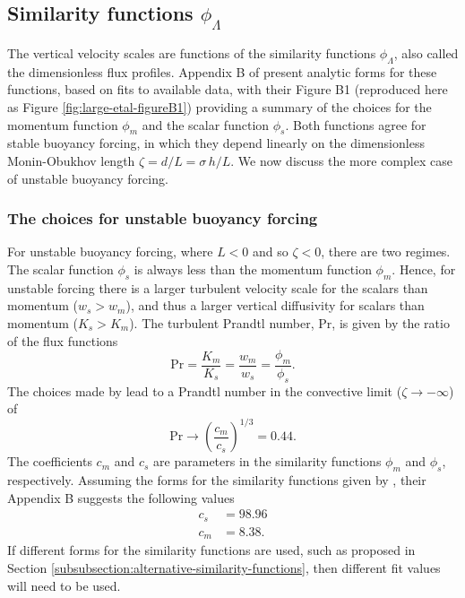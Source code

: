 \subsection{Similarity functions $\phi_{\Lambda}$}
\label{subsection:similarity-functions}

The vertical velocity scales are functions of the similarity functions
$\phi_{\Lambda}$, also called the dimensionless flux profiles.
Appendix B of \cite{LargeKPP} present analytic forms for these
functions, based on fits to available data, with their Figure B1
(reproduced here as Figure \ref{fig:large-etal-figureB1}) providing a
summary of the choices for the momentum function $\phi_{m}$ and the
scalar function $\phi_{s}$.  Both functions agree for stable buoyancy
forcing, in which they depend linearly on the dimensionless
Monin-Obukhov length $\zeta = d/L = \sigma \, h/L$.  We now discuss
the more complex case of unstable buoyancy forcing.


\subsubsection{The \cite{LargeKPP} choices for unstable buoyancy forcing}

For unstable buoyancy forcing, where $L<0$ and so $\zeta < 0$, there
are two regimes.  The scalar function $\phi_{s}$ is always less than
the momentum function $\phi_{m}$.  Hence, for unstable forcing there
is a larger turbulent velocity scale for the scalars than momentum
($w_{s} > w_{m}$), and thus a larger vertical diffusivity for scalars
than momentum ($K_{s} > K_{m}$).  The turbulent Prandtl number,
$\mbox{Pr}$, is given by the ratio of the flux functions
\begin{equation}
  \mbox{Pr} = \frac{K_{m}}{K_{s}} = \frac{w_{m}}{w_{s}} = \frac{\phi_{m}}{\phi_{s}}.
\label{eq:prandtl-number}
\end{equation}
The choices made by \cite{LargeKPP} lead to a Prandtl number in the
convective limit ($\zeta \rightarrow -\infty$) of 
\begin{equation}
 \mbox{Pr}  \rightarrow \left( \frac{c_{m}}{c_{s}} \right)^{1/3} = 0.44.
\label{eq:convective-limit-prandtl}
\end{equation}
The coefficients $c_{m}$ and $c_{s}$ are parameters in the similarity
functions $\phi_{m}$ and $\phi_{s}$, respectively.  Assuming the forms
for the similarity functions given by \cite{LargeKPP}, their Appendix
B suggests the following values
\begin{subequations}
\begin{align}
  c_{s} &=  98.96 \\
\label{eq:cs-defined}
  c_{m} &= 8.38.
\end{align}
\end{subequations}
If different forms for the similarity functions are used, such as
proposed in Section
\ref{subsubsection:alternative-similarity-functions}, then different
fit values will need to be used.


